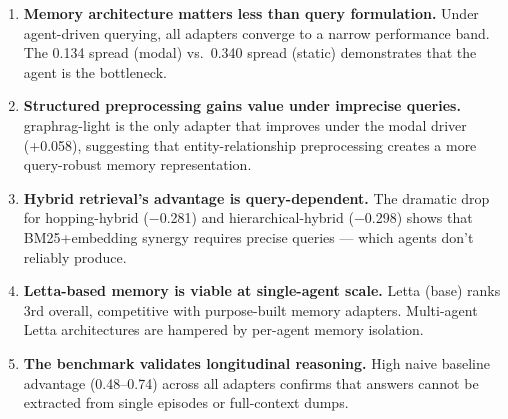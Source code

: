 \documentclass[11pt,a4paper]{article}
\begin{document}
\begin{enumerate}
  \item \textbf{Memory architecture matters less than query formulation.}
    Under agent-driven querying, all adapters converge to a narrow performance band.
    The 0.134 spread (modal) vs.\ 0.340 spread (static) demonstrates that the agent is the bottleneck.

  \item \textbf{Structured preprocessing gains value under imprecise queries.}
    graphrag-light is the only adapter that improves under the modal driver (+0.058), suggesting that entity-relationship preprocessing creates a more query-robust memory representation.

  \item \textbf{Hybrid retrieval's advantage is query-dependent.}
    The dramatic drop for hopping-hybrid ($-$0.281) and hierarchical-hybrid ($-$0.298) shows that BM25+embedding synergy requires precise queries --- which agents don't reliably produce.

  \item \textbf{Letta-based memory is viable at single-agent scale.}
    Letta (base) ranks 3rd overall, competitive with purpose-built memory adapters.
    Multi-agent Letta architectures are hampered by per-agent memory isolation.

  \item \textbf{The benchmark validates longitudinal reasoning.}
    High naive baseline advantage (0.48--0.74) across all adapters confirms that answers cannot be extracted from single episodes or full-context dumps.
\end{enumerate}
\end{document}
